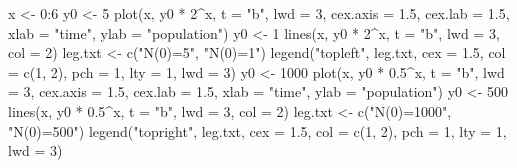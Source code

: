 \documentclass[
  letterpaper,
  DIV=11,
  numbers=noendperiod]{scrreprt}
\newenvironment{Shaded}{\begin{snugshade}}{\end{snugshade}}
\newcommand{\AttributeTok}[1]{\textcolor[rgb]{0.40,0.45,0.13}{#1}}
\newcommand{\DecValTok}[1]{\textcolor[rgb]{0.68,0.00,0.00}{#1}}
\newcommand{\FloatTok}[1]{\textcolor[rgb]{0.68,0.00,0.00}{#1}}
\newcommand{\FunctionTok}[1]{\textcolor[rgb]{0.28,0.35,0.67}{#1}}
\newcommand{\NormalTok}[1]{\textcolor[rgb]{0.00,0.23,0.31}{#1}}
\newcommand{\OtherTok}[1]{\textcolor[rgb]{0.00,0.23,0.31}{#1}}
\newcommand{\SpecialCharTok}[1]{\textcolor[rgb]{0.37,0.37,0.37}{#1}}
\newcommand{\StringTok}[1]{\textcolor[rgb]{0.13,0.47,0.30}{#1}}
\begin{document}
\begin{Shaded}
\begin{Highlighting}[]
\NormalTok{x }\OtherTok{\textless{}{-}} \DecValTok{0}\SpecialCharTok{:}\DecValTok{6}
\NormalTok{y0 }\OtherTok{\textless{}{-}} \DecValTok{5}
\FunctionTok{plot}\NormalTok{(x, y0 }\SpecialCharTok{*} \DecValTok{2}\SpecialCharTok{\^{}}\NormalTok{x, }\AttributeTok{t =} \StringTok{"b"}\NormalTok{, }\AttributeTok{lwd =} \DecValTok{3}\NormalTok{, }\AttributeTok{cex.axis =} \FloatTok{1.5}\NormalTok{,}
    \AttributeTok{cex.lab =} \FloatTok{1.5}\NormalTok{, }\AttributeTok{xlab =} \StringTok{"time"}\NormalTok{, }\AttributeTok{ylab =} \StringTok{"population"}\NormalTok{)}
\NormalTok{y0 }\OtherTok{\textless{}{-}} \DecValTok{1}
\FunctionTok{lines}\NormalTok{(x, y0 }\SpecialCharTok{*} \DecValTok{2}\SpecialCharTok{\^{}}\NormalTok{x, }\AttributeTok{t =} \StringTok{"b"}\NormalTok{, }\AttributeTok{lwd =} \DecValTok{3}\NormalTok{, }\AttributeTok{col =} \DecValTok{2}\NormalTok{)}
\NormalTok{leg.txt }\OtherTok{\textless{}{-}} \FunctionTok{c}\NormalTok{(}\StringTok{"N(0)=5"}\NormalTok{, }\StringTok{"N(0)=1"}\NormalTok{)}
\FunctionTok{legend}\NormalTok{(}\StringTok{"topleft"}\NormalTok{, leg.txt, }\AttributeTok{cex =} \FloatTok{1.5}\NormalTok{, }\AttributeTok{col =} \FunctionTok{c}\NormalTok{(}\DecValTok{1}\NormalTok{, }\DecValTok{2}\NormalTok{),}
    \AttributeTok{pch =} \DecValTok{1}\NormalTok{, }\AttributeTok{lty =} \DecValTok{1}\NormalTok{, }\AttributeTok{lwd =} \DecValTok{3}\NormalTok{)}
\NormalTok{y0 }\OtherTok{\textless{}{-}} \DecValTok{1000}
\FunctionTok{plot}\NormalTok{(x, y0 }\SpecialCharTok{*} \FloatTok{0.5}\SpecialCharTok{\^{}}\NormalTok{x, }\AttributeTok{t =} \StringTok{"b"}\NormalTok{, }\AttributeTok{lwd =} \DecValTok{3}\NormalTok{, }\AttributeTok{cex.axis =} \FloatTok{1.5}\NormalTok{,}
    \AttributeTok{cex.lab =} \FloatTok{1.5}\NormalTok{, }\AttributeTok{xlab =} \StringTok{"time"}\NormalTok{, }\AttributeTok{ylab =} \StringTok{"population"}\NormalTok{)}
\NormalTok{y0 }\OtherTok{\textless{}{-}} \DecValTok{500}
\FunctionTok{lines}\NormalTok{(x, y0 }\SpecialCharTok{*} \FloatTok{0.5}\SpecialCharTok{\^{}}\NormalTok{x, }\AttributeTok{t =} \StringTok{"b"}\NormalTok{, }\AttributeTok{lwd =} \DecValTok{3}\NormalTok{, }\AttributeTok{col =} \DecValTok{2}\NormalTok{)}
\NormalTok{leg.txt }\OtherTok{\textless{}{-}} \FunctionTok{c}\NormalTok{(}\StringTok{"N(0)=1000"}\NormalTok{, }\StringTok{"N(0)=500"}\NormalTok{)}
\FunctionTok{legend}\NormalTok{(}\StringTok{"topright"}\NormalTok{, leg.txt, }\AttributeTok{cex =} \FloatTok{1.5}\NormalTok{, }\AttributeTok{col =} \FunctionTok{c}\NormalTok{(}\DecValTok{1}\NormalTok{, }\DecValTok{2}\NormalTok{),}
    \AttributeTok{pch =} \DecValTok{1}\NormalTok{, }\AttributeTok{lty =} \DecValTok{1}\NormalTok{, }\AttributeTok{lwd =} \DecValTok{3}\NormalTok{)}
\end{Highlighting}
\end{Shaded}
\end{document}
